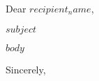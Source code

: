\documentclass[11pt]{letter}
\begin{document}
\begin{letter}{}

\date{$date$}

\opening{Dear $recipient_name$,}

\begin{flushleft}
\Large \textbf{$subject$}
\end{flushleft}
\vspace{1em}

$body$

\closing{Sincerely,}

\end{letter}
\end{document}
